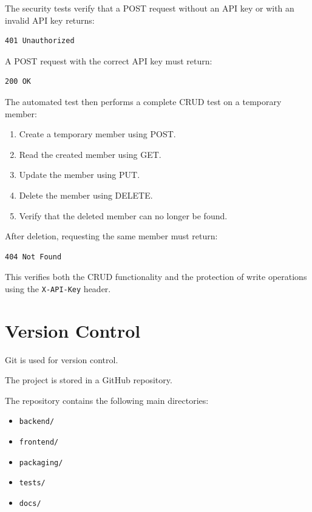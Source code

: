 \documentclass[12pt,a4paper]{article}
\begin{document}
The security tests verify that a POST request without an API key
or with an invalid API key returns:

\begin{lstlisting}
401 Unauthorized
\end{lstlisting}

A POST request with the correct API key must return:

\begin{lstlisting}
200 OK
\end{lstlisting}

The automated test then performs a complete CRUD test on a
temporary member:

\begin{enumerate}
    \item Create a temporary member using POST.
    \item Read the created member using GET.
    \item Update the member using PUT.
    \item Delete the member using DELETE.
    \item Verify that the deleted member can no longer be found.
\end{enumerate}

After deletion, requesting the same member must return:

\begin{lstlisting}
404 Not Found
\end{lstlisting}

This verifies both the CRUD functionality and the protection of
write operations using the \texttt{X-API-Key} header.



\section{Version Control}

Git is used for version control.

The project is stored in a GitHub repository.

The repository contains the following main directories:

\begin{itemize}
    \item \texttt{backend/}
    \item \texttt{frontend/}
    \item \texttt{packaging/}
    \item \texttt{tests/}
    \item \texttt{docs/}
\end{itemize}
\end{document}
